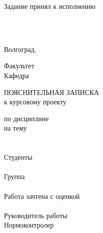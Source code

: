 {{Задание принял к исполнению
\vspace{-6mm}
\begin{flushright}
\begin{minipage}{19em}
\\
\\
\end{minipage}
\end{flushright}
\vspace{\fill}
\begin{center}
Волгоград,~\the\year
\end{center}
\newpage
\clearpage
\thispagestyle{empty}
\setcounter{page}{1}
\begin{center}
\VSTUTitleHeading
\end{center}
Факультет~\uline{\VSTUFaculty\hfill}\\
Кафедра~\uline{\VSTUDepartment\hfill}\\
\vspace{2cm}
\begin{center}
ПОЯСНИТЕЛЬНАЯ ЗАПИСКА\\
к курсовому проекту
\end{center}
по дисциплине \uline{\VSTUSubject\hfill}\\
на тему \VSTUTitleUL\uline{\hfill}\\
\\
\\
Студенты \\
\\
Группа \uline{\VSTUStudentGroup}\\
\\
Работа зачтена с оценкой \uline{\makebox[3.7cm]{}}
\\
\\
Руководитель работы 
\hfill
{}\\
Нормоконтролер 
}}

